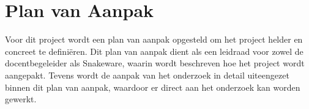 \section{Plan van Aanpak}
Voor dit project wordt een plan van aanpak opgesteld om het project helder en concreet te definiëren.
Dit plan van aanpak dient als een leidraad voor zowel de docentbegeleider als Snakeware, waarin wordt beschreven hoe het project wordt aangepakt.
Tevens wordt de aanpak van het onderzoek in detail uiteengezet binnen dit plan van aanpak, waardoor er direct aan het onderzoek kan worden gewerkt.
